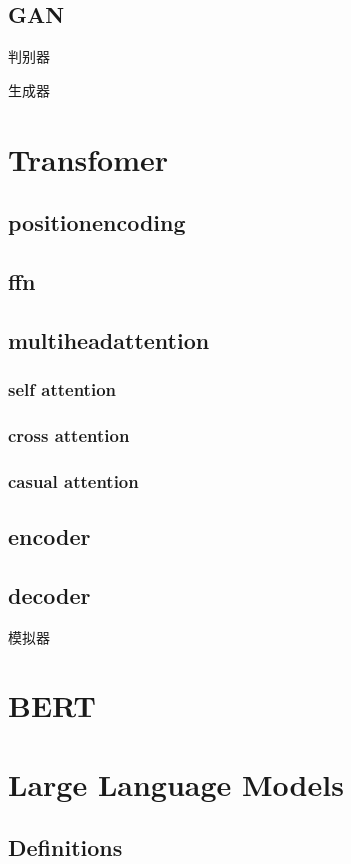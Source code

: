 \documentclass[lang=en,12pt]{beautybook}
\begin{document}
\section{GAN}
判别器

生成器
\chapter{Transfomer}
\section{positionencoding}
\section{ffn}
\section{multiheadattention}
\subsection{self attention}
\subsection{cross attention}
\subsection{casual attention}
\section{encoder}
\section{decoder}


模拟器

\chapter{BERT}
\chapter{Large Language Models}

\section{Definitions}
\end{document}
